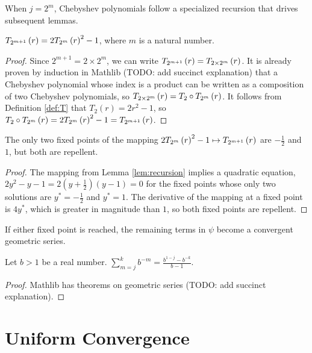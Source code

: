 When $j = 2^m$, Chebyshev polynomials follow a specialized recursion that drives subsequent lemmas.
\begin{lemma}[Doubling]
  \label{lem:recursion}
  \leanok
  $T_{2^{m + 1}}\left(r\right) = 2T_{2^{m}}\left(r\right)^2 - 1$, where $m$ is a natural number.
\end{lemma}
  
\begin{proof}
  \uses{}
  \leanok
  Since $2^{m + 1} = 2 \times 2^m$, we can write $T_{2^{m + 1}}\left(r\right) = T_{2 \times 2^m}\left(r\right)$. It is already proven by induction in Mathlib (TODO: add succinct explanation) that a Chebyshev polynomial whose index is a product can be written as a composition of two Chebyshev polynomials, so $T_{2 \times 2^m}\left(r\right) = T_2 \circ T_{2^{m}}\left(r\right)$. It follows from Definition \ref{def:T} that $T_2\left(r\right) = 2r^2 - 1$, so $T_2 \circ T_{2^{m}}\left(r\right) = 2T_{2^{m}}\left(r\right)^2 - 1 = T_{2^{m + 1}}\left(r\right)$.
\end{proof}

\begin{lemma}
  \label{lem:repellent}
  \leanok
  The only two fixed points of the mapping $2 T_{2^{m}}\left(r\right)^2 - 1 \mapsto T_{2^{m + 1}}\left(r\right)$ are $-\frac{1}{2}$ and $1$, but both are repellent.
\end{lemma}

\begin{proof}
  \leanok
  The mapping from Lemma \ref{lem:recursion} implies a quadratic equation, $2y^2 - y - 1 = 2\left(y + \frac{1}{2}\right)\left(y - 1\right) = 0$ for the fixed points whose only two solutions are $y^\ast = -\frac{1}{2}$ and $y^\ast = 1$. The derivative of the mapping at a fixed point is $4y^\ast$, which is greater in magnitude than $1$, so both fixed points are repellent.
\end{proof}
\noindent If either fixed point is reached, the remaining terms in $\psi$ become a convergent geometric series.
\begin{lemma}
  \label{lem:geometric}
  \leanok
  Let $b > 1$ be a real number. $\sum\limits_{m = j}^k b^{-m} = \frac{b^{1 - j} - b^{-k}}{b - 1}$.
\end{lemma}
\begin{proof}
  \leanok
  Mathlib has theorems on geometric series (TODO: add succinct explanation).
\end{proof}

\section{Uniform Convergence}\label{sec:UniformConvergence}

